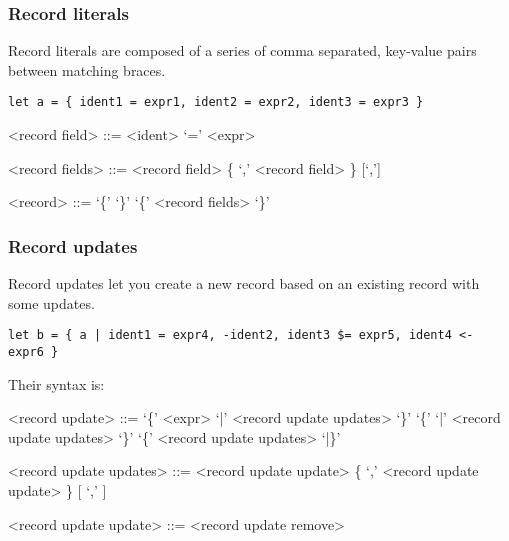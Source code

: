 \subsubsection{Record literals}
Record literals are composed of a series of comma separated, key-value pairs between matching braces.

\begin{verbatim}
let a = { ident1 = expr1, ident2 = expr2, ident3 = expr3 }
\end{verbatim}

\begin{grammar}
<record field>  ::= <ident> `=' <expr>

<record fields> ::= <record field> \{ `,' <record field> \} [`,']

<record> ::= `\{' `\}'
        \alt `\{' <record fields> `\}'
\end{grammar}


\subsubsection{Record updates}
Record updates let you create a new record based on an existing record with some updates.

\begin{verbatim}
let b = { a | ident1 = expr4, -ident2, ident3 $= expr5, ident4 <- expr6 }
\end{verbatim}

Their syntax is:
\begin{grammar}
<record update> ::= `\{' <expr> `|' <record update updates> `\}'
               \alt `\{' `|' <record update updates> `\}'
               \alt `\{' <record update updates> `|\}'

<record update updates> ::= <record update update> \{ `,' <record update update> \} [ `,' ]

<record update update> ::= <record update remove>
\end{grammar}

